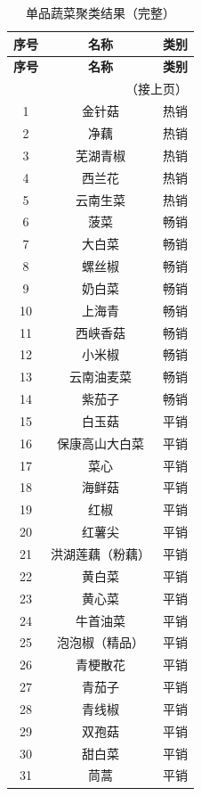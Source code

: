 \documentclass[a4paper,12pt]{article}
\begin{document}
	\begin{longtable}{c|c|c}
		\caption{单品蔬菜聚类结果（完整）} \\
		\hline
		\textbf{序号} & \textbf{名称} & \textbf{类别} \\
		\hline
		\endfirsthead
		\hline
		\textbf{序号} & \textbf{名称} & \textbf{类别} \\
		\hline
		\endhead
		\hline
		\multicolumn{3}{r}{（接上页）} \\
		\endfoot
		\hline
		\endlastfoot
		
		1 & 金针菇 & 热销 \\
		2 & 净藕 & 热销 \\
		3 & 芜湖青椒 & 热销 \\
		4 & 西兰花 & 热销 \\
		5 & 云南生菜 & 热销 \\
		\hline
		6 & 菠菜 & 畅销 \\
		7 & 大白菜 & 畅销 \\
		8 & 螺丝椒 & 畅销 \\
		9 & 奶白菜 & 畅销 \\
		10 & 上海青 & 畅销 \\
		11 & 西峡香菇 & 畅销 \\
		12 & 小米椒 & 畅销 \\
		13 & 云南油麦菜 & 畅销 \\
		14 & 紫茄子 & 畅销 \\
		\hline
		15 & 白玉菇 & 平销 \\
		16 & 保康高山大白菜 & 平销 \\
		17 & 菜心 & 平销 \\
		18 & 海鲜菇 & 平销 \\
		19 & 红椒 & 平销 \\
		20 & 红薯尖 & 平销 \\
		21 & 洪湖莲藕（粉藕） & 平销 \\
		22 & 黄白菜 & 平销 \\
		23 & 黄心菜 & 平销 \\
		24 & 牛首油菜 & 平销 \\
		25 & 泡泡椒（精品） & 平销 \\
		26 & 青梗散花 & 平销 \\
		27 & 青茄子 & 平销 \\
		28 & 青线椒 & 平销 \\
		29 & 双孢菇 & 平销 \\
		30 & 甜白菜 & 平销 \\
		31 & 茼蒿 & 平销 \\

\end{longtable}
\end{document}
